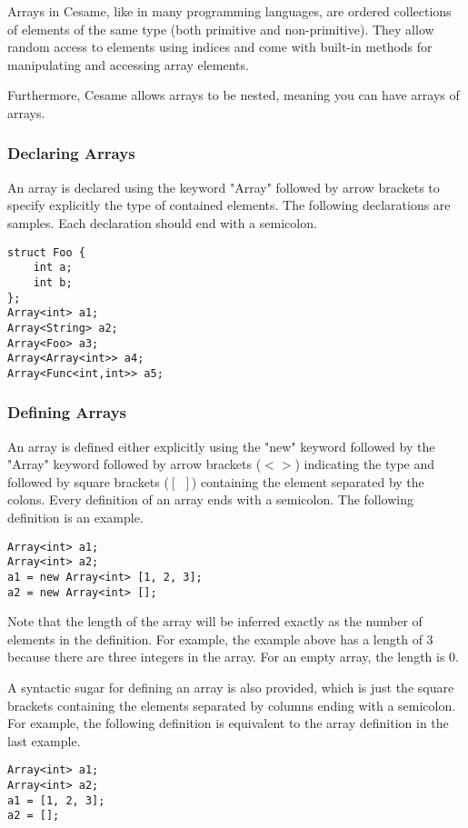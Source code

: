 Arrays in Cesame, like in many programming languages, are ordered collections of elements of the same type (both primitive and non-primitive). They allow random access to elements using indices and come with built-in methods for manipulating and accessing array elements. 

Furthermore, Cesame allows arrays to be nested, meaning you can have arrays of arrays.

\subsubsection{Declaring Arrays}
An array is declared using the keyword "Array" followed by arrow brackets to specify explicitly the type of contained elements. The following declarations are samples. Each declaration should end with a semicolon.
\begin{lstlisting}[caption={array\_declaration.csm}, captionpos=b]
struct Foo {
    int a;
    int b;
};
Array<int> a1;
Array<String> a2;
Array<Foo> a3;
Array<Array<int>> a4;
Array<Func<int,int>> a5;
\end{lstlisting}

\subsubsection{Defining Arrays}
An array is defined either explicitly using the "new" keyword followed by the "Array" keyword followed by arrow brackets ($<>$) indicating the type and followed by square brackets ($[\ \ ]$) containing the element separated by the colons. Every definition of an array ends with a semicolon. The following definition is an example.
\begin{lstlisting}[caption={array\_definition.csm}, captionpos=b]
Array<int> a1;
Array<int> a2;
a1 = new Array<int> [1, 2, 3];
a2 = new Array<int> [];

\end{lstlisting}
Note that the length of the array will be inferred exactly as the number of elements in the definition. For example, the example above has a length of 3 because there are three integers in the array. For an empty array, the length is 0.
\par A syntactic sugar for defining an array is also provided, which is just the square brackets containing the elements separated by columns ending with a semicolon. For example, the following definition is equivalent to the array definition in the last example.
\begin{lstlisting}[caption={array\_definition\_short.csm}, captionpos=b]
Array<int> a1;
Array<int> a2;
a1 = [1, 2, 3];
a2 = [];


\end{lstlisting}

